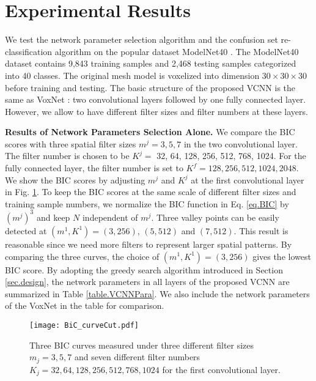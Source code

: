 \documentclass[preprint,12pt]{elsarticle}
\begin{document}
\section{Experimental Results} \label{sec.experiment}

We test the network parameter selection algorithm and the confusion set
re-classification algorithm on the popular dataset ModelNet40
\cite{wu20153d}.  The ModelNet40 dataset contains 9,843 training samples
and 2,468 testing samples categorized into 40 classes. The original mesh
model is voxelized into dimension $30 \times 30 \times 30$ before
training and testing. The basic structure of the proposed VCNN is the
same as VoxNet \cite{maturana2015voxnet}: two convolutional layers
followed by one fully connected layer. However, we allow to have
different filter sizes and filter numbers at these layers. 



{\bf Results of Network Parameters Selection Alone.} We compare the BIC
scores with three spatial filter sizes $m^j = 3, 5, 7$ in the two
convolutional layer. The filter number is chosen to be $K^j =$ 32, 64,
128, 256, 512, 768, 1024. For the fully connected layer, the filter
number is set to $K^f = 128, 256, 512, 1024, 2048$. We show the BIC
scores by adjusting $m^j$ and $K^j$ at the first convolutional layer in
Fig.  \ref{fig.BICcurve}.  To keep the BIC scores at the same scale of
different filter sizes and training sample numbers, we normalize the BIC
function in Eq.  \ref{eq.BIC} by $(m^j)^3$ and keep $N$ independent of
$m^j$. Three valley points can be easily detected at $(m^1,K^1) = (3,
256)$, $(5,512)$ and $(7,512)$. This result is reasonable since we need
more filters to represent larger spatial patterns.  By comparing the
three curves, the choice of $(m^1,K^1) = (3,256)$ gives the lowest BIC
score. By adopting the greedy search algorithm introduced in Section
\ref{sec.design}, the network parameters in all layers of the proposed
VCNN are summarized in Table \ref{table.VCNNPara}. We also include the
network parameters of the VoxNet in the table for comparison. 

\begin{figure}[t!]
\centering
\texttt{[image: BiC\_curveCut.pdf]}
\caption{Three BIC curves measured under three different filter sizes
$m_j = 3, 5, 7$ and seven different filter numbers $K_j = 32, 64, 128,
256, 512, 768, 1024$ for the first convolutional layer.}\label{fig.BICcurve}
\end{figure}
\end{document}
